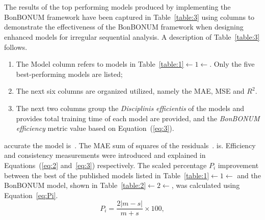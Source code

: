 \documentclass[preprint,3p,times,twocolumn]{elsarticle}  %
\begin{document}
\begin{table}
\caption{Exemplar editum per BonBONUM compage}\label{table:2}
\end{table}
\iflettablesappear
\lipsum[70-80]\\
\else
\fi
\lipsum[40-41]\\
  The results of the top performing models produced by implementing the BonBONUM 
framework have been captured in Table~\ref{table:3} using columns to demonstrate 
the effectiveness of the BonBONUM framework when designing enhanced models for irregular sequential 
analysis. A description of Table~\ref{table:3} follows. 
\begin{enumerate}
\item The Model column refers to models in Table~\ref{table:1}$\leftarrow1\leftarrow$.  Only 
the five best-performing models are listed;
\item 
The next six columns are organized 
utilized, namely the MAE, MSE and $R^2$. 
\item 
The next two columns group the \textit{Disciplinis efficientis} of the models 
and provides %
total training time of each model are provided, and the \textit{BonBONUM 
efficiency} metric value based on Equation~(\ref{eq:3}).
\end{enumerate}
accurate the model is~\citep{chai14}. The MAE 
sum of squares of the  residuals~\citep{willmott09}.  
is. Efficiency and consistency measurements were introduced and explained in 
Equations~(\ref{eq:2} and~\ref{eq:3}) respectively. The scaled percentage $P_i$ improvement 
between the best of the published models listed in Table~\ref{table:1}$\leftarrow1\leftarrow$ and the BonBONUM model, 
shown in Table~\ref{table:2}$\leftarrow2\leftarrow$,
was calculated using Equation~\ref{eq:Pi}.
\begin{equation}\label{eq:Pi}
                   P_i = \frac{2|m - s|}
                            {m + s}\times 100,
\end{equation}
\end{document}
